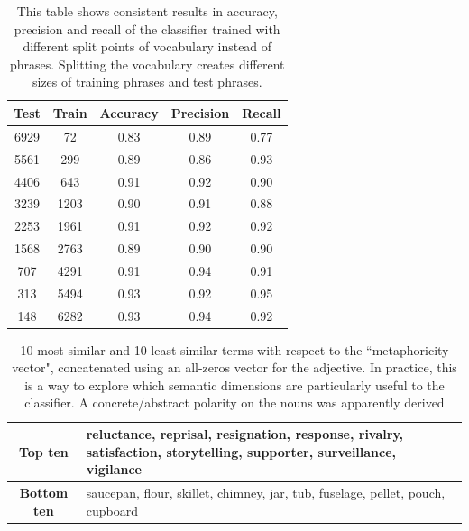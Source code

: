 \begin{table}[t]
	\centering
	\begin{tabular}{|c c| c  c  c |}
	\hline
	Test & Train & Accuracy & Precision & Recall \\
	\hline
	6929 & 72   &  0.83 &   0.89 &  0.77 \\
	\hline
	5561 & 299  &  0.89 &   0.86 &  0.93 \\
	\hline
	4406 & 643  &  0.91 &   0.92 &  0.90 \\
	\hline
	3239 & 1203  &  0.90 &   0.91 &  0.88 \\
	\hline
	2253 & 1961  &  0.91 &   0.92 &  0.92 \\
	\hline
	1568 & 2763  &  0.89 &   0.90 &  0.90 \\
	\hline
	707  & 4291  &  0.91 &   0.94 &  0.91 \\
	\hline
	313  & 5494  &  0.93 &   0.92 &  0.95 \\
	\hline
	148  & 6282  &  0.93 &   0.94 &  0.92 \\
	\hline
	\end{tabular}
	\vspace{0.5em}
	\caption{\label{stylevar2017:tab:voc-split} This table shows consistent results in accuracy, precision and recall of the classifier trained with different split points of vocabulary instead of phrases. Splitting the vocabulary creates different sizes of training phrases and test phrases.}
\end{table}

\begin{table}[t]
	\centering
	\begin{tabular}{|c|p{5cm}|}
	\hline 
	\textbf{Top ten} & reluctance,
	 reprisal,
	 resignation,
	 response,
	 rivalry,
	 satisfaction,
	 storytelling,
	 supporter,
	 surveillance,
	 vigilance \\
	\hline 
	\textbf{Bottom ten} &
	saucepan,
	flour,
	skillet,
	chimney,
	jar,
	tub,
	fuselage,
	pellet,
	pouch,
	cupboard
	 \\
	\hline 
	\end{tabular}
	\vspace{0.5em}
	\caption{\label{stylevar2017:tab:polar} 10 most similar and  10 least similar terms with respect to the ``metaphoricity vector", concatenated using an all-zeros vector for the adjective. In practice, this is a way to explore which semantic dimensions are particularly useful to the classifier. A concrete/abstract polarity on the nouns was apparently derived}
\end{table}



